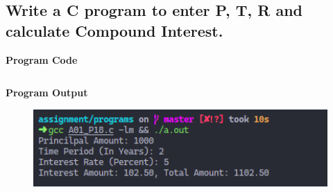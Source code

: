 \documentclass[a4paper, onecolumn]{article}
\begin{document}
\newpage



\subsection{Write a C program to enter P, T, R and calculate Compound Interest.}
\textbf{Program Code}

\inputminted{C}{programs/A01_P18.c}

\textbf{Program Output}

\begin{figure}[h]
  \includegraphics[width=12cm]{A01_P18}
\end{figure}

\newpage

\end{document}
